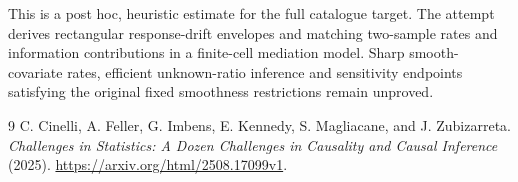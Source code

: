 \documentclass[11pt]{article}
\theoremstyle{remark}
\begin{document}
This is a post hoc, heuristic estimate for the full catalogue target.
The attempt derives rectangular response-drift envelopes and matching two-sample rates and information contributions in a finite-cell mediation model. Sharp smooth-covariate rates, efficient unknown-ratio inference and sensitivity endpoints satisfying the original fixed smoothness restrictions remain unproved.

\begin{thebibliography}{9}
 C. Cinelli, A. Feller, G. Imbens, E. Kennedy, S. Magliacane, and J. Zubizarreta. \emph{Challenges in Statistics: A Dozen Challenges in Causality and Causal Inference} (2025). \url{https://arxiv.org/html/2508.17099v1}.
\end{thebibliography}
\end{document}
